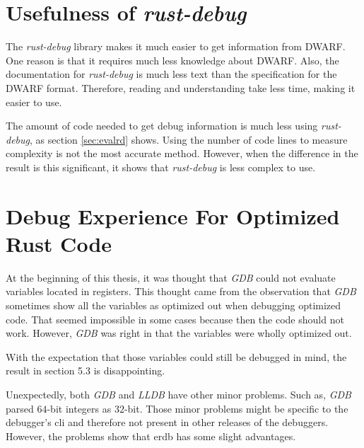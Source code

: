 


\section{Usefulness of \emph{rust-debug}}
The \emph{rust-debug} library makes it much easier to get information from \gls{DWARF}.
One reason is that it requires much less knowledge about \gls{DWARF}.
Also, the documentation for \emph{rust-debug} is much less text than the specification for the \gls{DWARF} format.
Therefore, reading and understanding take less time, making it easier to use.


The amount of code needed to get debug information is much less using \emph{rust-debug}, as section \ref{sec:evalrd} shows.
Using the number of code lines to measure complexity is not the most accurate method.
However, when the difference in the result is this significant, it shows that \emph{rust-debug} is less complex to use.



\section{Debug Experience For Optimized Rust Code}
At the beginning of this thesis, it was thought that \emph{GDB} could not evaluate variables located in registers.
This thought came from the observation that \emph{GDB} sometimes show all the variables as optimized out when debugging optimized code.
That seemed impossible in some cases because then the code should not work.
However, \emph{GDB} was right in that the variables were wholly optimized out.


With the expectation that those variables could still be debugged in mind, the result in section 5.3 is disappointing.


Unexpectedly, both \emph{GDB} and \emph{LLDB} have other minor problems.
Such as, \emph{GDB} parsed $64$-bit integers as $32$-bit.
Those minor problems might be specific to the debugger's \gls{cli} and therefore not present in other releases of the debuggers.
However, the problems show that \gls{erdb} has some slight advantages.



